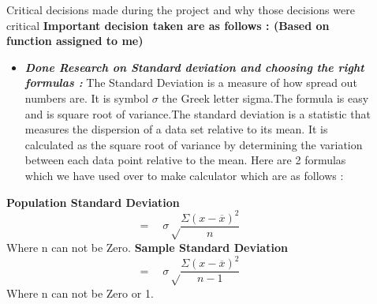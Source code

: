 \documentclass[final]{beamer}
\newlength{\sepwid}
\newlength{\onecolwid}
\newlength{\twocolwid}
\begin{document}
\begin{frame}[t]
\begin{columns}[t]
\begin{column}{\onecolwid}
\begin{block}{Critical decisions made during the project and why those decisions were critical}
\textbf{Important decision taken are as follows : (Based on function assigned to me)}
\begin{itemize}
\item  \textit{\textbf{Done Research on Standard deviation and choosing the right formulas :}}
The Standard Deviation is a measure of how spread out numbers are. It is symbol ${\sigma}$  the Greek letter sigma.The formula is easy and is square root of variance.The standard deviation is a statistic that measures the dispersion of a data set relative to its mean. It is calculated as the square root of variance by determining the variation between each data point relative to the mean.
Here are 2 formulas which we have used over to make calculator which are as follows :
\end{itemize}

\textbf{ Population Standard Deviation}\newline
 \begin{equation*}=
    \quad \sigma  \sqrt\frac{{\Sigma (x- \overline{x})^2}}{n}
  \end{equation*}
  Where n can not be Zero.
  \textbf{Sample Standard Deviation}
 \begin{equation*}=
    \quad \sigma  \sqrt\frac{{\Sigma (x- \overline{x})^2}}{n-1}
  \end{equation*}
  Where n can not be Zero or 1.
\end{block}

\end{column} %

\begin{column}{\sepwid}\end{column} %

\begin{column}{\twocolwid} %

\begin{columns}[t,totalwidth=\twocolwid] %

\begin{column}{\onecolwid}\vspace{-.6in} %



\end{column}
\end{columns}
\end{column}
\end{columns}
\end{frame}
\end{document}
